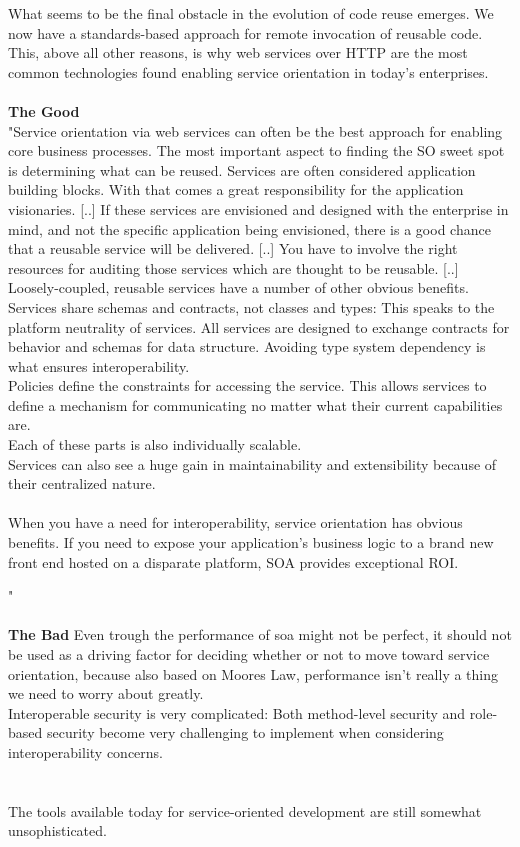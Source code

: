 \documentclass[12pt]{article}
\begin{document}
What seems to be the final obstacle in the evolution of code reuse emerges. We now have a standards-based approach for remote invocation of reusable code. This, above all other reasons, is why web services over HTTP are the most common technologies found enabling service orientation in today’s enterprises.
\\ \\
\textbf{The Good}\\
"Service orientation via web services can often be the best approach for enabling core business processes. The most important aspect to finding the SO sweet spot is determining what can be reused. Services are often considered application building blocks. With that comes a great responsibility for the application visionaries. [..] 
If these services are envisioned and designed with the enterprise in mind, and not the specific application being envisioned, there is a good chance that a reusable service will be delivered. [..] You have to involve the right resources for auditing those services which are thought to be reusable. [..]
Loosely-coupled, reusable services have a number of other obvious benefits. \\
Services share schemas and contracts, not classes and types: This speaks to the platform neutrality of services. All services are designed to exchange contracts for behavior and schemas for data structure. Avoiding type system dependency is what ensures interoperability. \\
Policies define the constraints for accessing the service. This allows services to define a mechanism for communicating no matter what their current capabilities are.\\
Each of these parts is also individually scalable.\\Services can also see a huge gain in maintainability and extensibility because of their centralized nature.\\ \\
When you have a need for interoperability, service orientation has obvious benefits. If you need to expose your application’s business logic to a brand new front end hosted on a disparate platform, SOA provides exceptional ROI.

 "\cite{pcsoa} \\ \\
\textbf{The Bad}
Even trough the performance of \gls{soa} might not be perfect, it should not be used as a driving factor for deciding whether or not to move toward service orientation, because also based on Moores Law, performance isn't really a thing we need to worry about greatly. \cite{pcsoa}\\
Interoperable security is very complicated: Both method-level security and role-based security become very challenging to implement when considering interoperability concerns. \\
\\ \\ 
The tools available today for service-oriented development are still somewhat unsophisticated.
\\ \\
\end{document}

